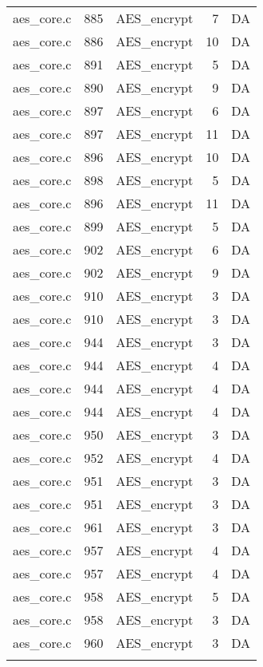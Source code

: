 \begin{table}[h]
{\begin{tabular}{clrrr}
aes\_core.c&885&AES\_encrypt&7 &DA\\
aes\_core.c&886&AES\_encrypt&10&DA\\
aes\_core.c&891&AES\_encrypt&5 &DA\\
aes\_core.c&890&AES\_encrypt&9 &DA\\
aes\_core.c&897&AES\_encrypt&6 &DA\\
aes\_core.c&897&AES\_encrypt&11&DA\\
aes\_core.c&896&AES\_encrypt&10&DA\\
aes\_core.c&898&AES\_encrypt&5 &DA\\
aes\_core.c&896&AES\_encrypt&11&DA\\
aes\_core.c&899&AES\_encrypt&5 &DA\\
aes\_core.c&902&AES\_encrypt&6 &DA\\
aes\_core.c&902&AES\_encrypt&9 &DA\\
aes\_core.c&910&AES\_encrypt&3 &DA\\
aes\_core.c&910&AES\_encrypt&3 &DA\\
aes\_core.c&944&AES\_encrypt&3 &DA\\
aes\_core.c&944&AES\_encrypt&4 &DA\\
aes\_core.c&944&AES\_encrypt&4 &DA\\
aes\_core.c&944&AES\_encrypt&4 &DA\\
aes\_core.c&950&AES\_encrypt&3 &DA\\
aes\_core.c&952&AES\_encrypt&4 &DA\\
aes\_core.c&951&AES\_encrypt&3 &DA\\
aes\_core.c&951&AES\_encrypt&3 &DA\\
aes\_core.c&961&AES\_encrypt&3 &DA\\
aes\_core.c&957&AES\_encrypt&4 &DA\\
aes\_core.c&957&AES\_encrypt&4 &DA\\
aes\_core.c&958&AES\_encrypt&5 &DA\\
aes\_core.c&958&AES\_encrypt&3 &DA\\
aes\_core.c&960&AES\_encrypt&3 &DA\\
&&&&\\
\hline
\end{tabular}
}
\end{table}